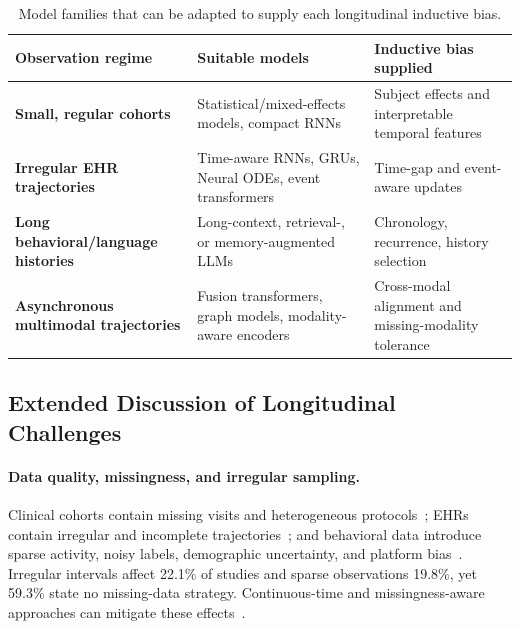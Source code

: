 \documentclass[11pt]{article}
\theoremstyle{plain}
\theoremstyle{definition}
\theoremstyle{remark}
\begin{document}
\begin{table}[!t]
\centering
\small
\setlength{\tabcolsep}{3.5pt}
\renewcommand{\arraystretch}{0.96}
\begin{tabularx}{\textwidth}{@{}>{\raggedright\arraybackslash\bfseries}p{3.6cm}>{\raggedright\arraybackslash}p{5.4cm}>{\raggedright\arraybackslash}X@{}}
\toprule
\rowcolor{gray!18}
\textbf{Observation regime} & \textbf{Suitable models} & \textbf{Inductive bias supplied} \\
\midrule
Small, regular cohorts & Statistical/mixed-effects models, compact RNNs & Subject effects and interpretable temporal features \\
Irregular EHR trajectories & Time-aware RNNs, GRUs, Neural ODEs, event transformers & Time-gap and event-aware updates \\
Long behavioral/language histories & Long-context, retrieval-, or memory-augmented LLMs & Chronology, recurrence, history selection \\
Asynchronous multimodal trajectories & Fusion transformers, graph models, modality-aware encoders & Cross-modal alignment and missing-modality tolerance \\
\bottomrule
\end{tabularx}
\caption{Model families that can be adapted to supply each longitudinal inductive bias.}
\label{tab:model_selection_guide}
\end{table}

\subsection{Extended Discussion of Longitudinal Challenges}
\label{sec:appendix_challenges}
\paragraph{Data quality, missingness, and irregular sampling.} Clinical cohorts contain missing visits and heterogeneous protocols~\cite{9342532,9377173,9374343,10635830,10069449,9983643,10635519}; EHRs contain irregular and incomplete trajectories~\cite{8904478,9006400,9679113}; and behavioral data introduce sparse activity, noisy labels, demographic uncertainty, and platform bias~\cite{harrigian-dredze-2022-now,tsakalidis-etal-2022-overview,tsakalidis-etal-2022-identifying,bayram-benhiba-2022-emotionally}. Irregular intervals affect 22.1\% of studies and sparse observations 19.8\%, yet 59.3\% state no missing-data strategy. Continuous-time and missingness-aware approaches can mitigate these effects~\cite{9871150,10340079}.
\end{document}
